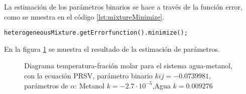 	La estimación de los parámetros binarios se hace a través de la función error, como se muestra en el código \ref{lst:mixtureMinimize}.

\begin{lstlisting}[label={lst:mixtureMinimize},caption={Estimación de los parámetros binarios de la regla de mezclado minimizando el valor de la función error.}]
	heterogeneousMixture.getErrorfunction().minimize();
\end{lstlisting}

	En la figura \ref{fig:binaryafter} se muestra el resultado de la estimación de parámetros.



\begin{figure}[!h]
	\centering
	\caption{Diagrama temperatura-fración molar para el sistema agua-metanol, con la ecuación PRSV, parámetro binario $kij=-0.0739981$, parámetros de $\alpha$: Metanol $k= -2.7 \cdot 10^{-5}$,Agua $ k= 0.009276$  }\label{fig:binaryafter}
\end{figure}









